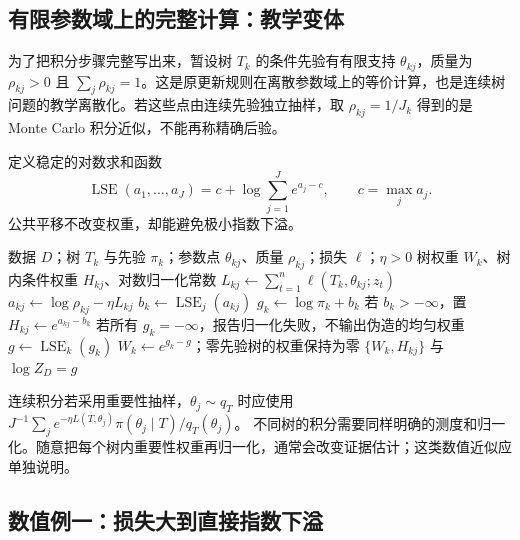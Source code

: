 \documentclass[UTF8,11pt,fontset=fandol,openany,oneside]{ctexbook}
\theoremstyle{definition}
\theoremstyle{remark}
\numberwithin{equation}{chapter}
\begin{document}
\subsection{有限参数域上的完整计算：教学变体}

为了把积分步骤完整写出来，暂设树 $T_k$ 的条件先验有有限支持
$\theta_{kj}$，质量为 $\rho_{kj}>0$ 且 $\sum_j\rho_{kj}=1$。这是原更新规则在离散参数域上的等价计算，也是连续树问题的教学离散化。若这些点由连续先验独立抽样，取 $\rho_{kj}=1/J_k$ 得到的是 Monte Carlo 积分近似，不能再称精确后验。

定义稳定的对数求和函数
\[
 \operatorname{LSE}(a_1,\ldots,a_J)
 =c+\log\sum_{j=1}^J e^{a_j-c},\qquad c=\max_j a_j.
\]
公共平移不改变权重，却能避免极小指数下溢。

\begin{algorithm}[htbp]
\caption{S14：有限候选树与有限条件先验的指数更新（教学离散化）}
\label{alg:textbook-S14}
\begin{algorithmic}[1]
\Require 数据 $D$；树 $T_k$ 与先验 $\pi_k$；参数点 $\theta_{kj}$、质量 $\rho_{kj}$；损失 $\ell$；$\eta>0$
\Ensure 树权重 $W_k$、树内条件权重 $H_{kj}$、对数归一化常数
    \State $L_{kj}\gets\sum_{t=1}^n\ell(T_k,\theta_{kj};z_t)$
    \State $a_{kj}\gets\log\rho_{kj}-\eta L_{kj}$
  \EndFor
  \State $b_k\gets\operatorname{LSE}_j(a_{kj})$
  \State $g_k\gets\log\pi_k+b_k$
  \State 若 $b_k>-\infty$，置 $H_{kj}\gets e^{a_{kj}-b_k}$
\EndFor
\State 若所有 $g_k=-\infty$，报告归一化失败，不输出伪造的均匀权重
\State $g\gets\operatorname{LSE}_k(g_k)$
\State $W_k\gets e^{g_k-g}$；零先验树的权重保持为零
\State \Return $\{W_k,H_{kj}\}$ 与 $\log Z_D=g$
\end{algorithmic}
\end{algorithm}

连续积分若采用重要性抽样，$\theta_j\sim q_T$ 时应使用
$J^{-1}\sum_j e^{-\eta L(T,\theta_j)}\pi(\theta_j\mid T)/q_T(\theta_j)$。
不同树的积分需要同样明确的测度和归一化。随意把每个树内重要性权重再归一化，通常会改变证据估计；这类数值近似应单独说明。

\subsection{数值例一：损失大到直接指数下溢}
\end{document}
